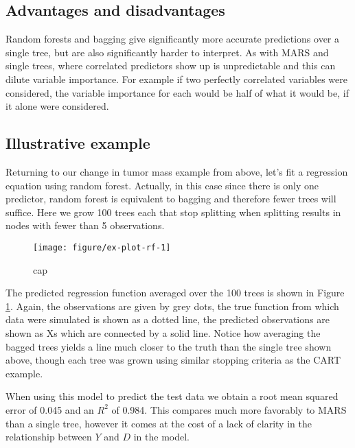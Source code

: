 \documentclass[12pt]{article}
\begin{document}

\subsection{Advantages and disadvantages} %
\label{sub:advantages_and_disadvantages_rf}

Random forests and bagging give significantly more accurate predictions over a single tree, but are also significantly harder to interpret. As with MARS and single trees, where correlated predictors show up is unpredictable and this can dilute variable importance. For example if two perfectly correlated variables were considered, the variable importance for each would be half of what it would be, if it alone were considered.


\subsection{Illustrative example} %
\label{sub:example}

Returning to our change in tumor mass example from above, let's fit a regression equation using random forest. Actually, in this case since there is only one predictor, random forest is equivalent to bagging and therefore fewer trees will suffice. Here we grow 100 trees each that stop splitting when splitting results in nodes with fewer than 5 observations.

\begin{figure}[!htbp]

{\centering \texttt{[image: figure/ex-plot-rf-1]} 

}

\caption[cap]{cap}\label{fig:ex-plot-rf}
\end{figure}


The predicted regression function averaged over the 100 trees is shown in Figure \ref{fig:ex-plot-rf}. Again, the observations are given by grey dots, the true function from which data were simulated is shown as a dotted line, the predicted observations are shown as Xs which are connected by a solid line. Notice how averaging the bagged trees yields a line much closer to the truth than the single tree shown above, though each tree was grown using similar stopping criteria as the CART example.

When using this model to predict the test data we obtain a root mean squared error of 0.045 and an $R^2$ of 0.984. This compares much more favorably to MARS than a single tree, however it comes at the cost of a lack of clarity in the relationship between $Y$ and $D$ in the model.
\end{document}
